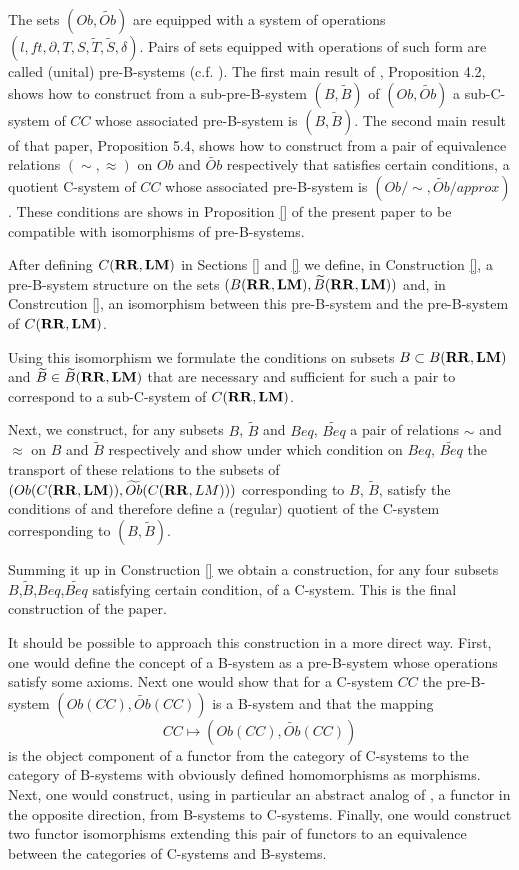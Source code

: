 \documentclass[12pt]{amsart}
\newcommand{\wt}{\widetilde}
\newcommand{\RR}{{\bf RR}}
\newcommand{\LM}{{\bf LM}}
\begin{document}
The sets $(Ob,\wt{Ob})$ are equipped with a system of operations $(l,ft,\partial,T,S,\wt{T},\wt{S},\delta)$. Pairs of sets equipped with operations of such form are called (unital) pre-B-systems (c.f. \cite{Bsystemsnew}). The first main result of \cite{Csubsystems}, Proposition 4.2, shows how to construct from a sub-pre-B-system $(B,\wt{B})$ of $(Ob,\wt{Ob})$ a sub-C-system of $CC$ whose associated pre-B-system is $(B,\wt{B})$. The second main result of that paper, Proposition 5.4, shows how to construct from a pair of equivalence relations $(\sim,\approx)$ on $Ob$ and $\wt{Ob}$ respectively that satisfies certain conditions, a quotient C-system of $CC$ whose associated pre-B-system is $(Ob/\sim,\wt{Ob}/approx)$. These conditions are shows in Proposition \ref{} of the present paper to be compatible with isomorphisms of pre-B-systems. 

After defining $C(\RR,\LM)$ in Sections \ref{} and \ref{} 
we define, in Construction \ref{}, a pre-B-system structure on the sets $(B(\RR,\LM),\wt{B}(\RR,\LM))$ and, in Constrcution \ref{}, an isomorphism between this pre-B-system and the pre-B-system of $C(\RR,\LM)$. 

Using this isomorphism we formulate the conditions on subsets $B\subset B(\RR,\LM)$ and $\wt{B}\in \wt{B}(\RR,\LM)$ that are necessary and sufficient for such a pair to correspond to a sub-C-system of $C(\RR,\LM)$.

Next, we construct, for any subsets $B$, $\wt{B}$ and $Beq$, $\wt{Beq}$ a pair of relations $\sim$ and $\approx$ on $B$ and $\wt{B}$ respectively and show under which condition on $Beq$, $\wt{Beq}$ the transport of these relations to the subsets of $(Ob(C(\RR,\LM)),\wt{Ob}(C(\RR,LM)))$ corresponding to $B$, $\wt{B}$, satisfy the conditions of \cite[Prop. 5.4]{Csubsystems} and therefore define a (regular) quotient of the C-system corresponding to $(B,\wt{B})$.

Summing it up in Construction \ref{} we obtain a construction, for any four subsets $B$,$\wt{B}$,$Beq$,$\wt{Beq}$ satisfying certain condition, of a C-system. This is the final construction of the paper.

It should be possible to approach this construction in a more direct way. First, one would define the concept of a B-system as a pre-B-system whose operations satisfy some axioms. Next one would show that for a C-system $CC$ the pre-B-system $(Ob(CC),\wt{Ob}(CC))$ is a B-system and that the mapping 
%
$$CC\mapsto (Ob(CC),\wt{Ob}(CC))$$
%
is the object component of a functor from the category of C-systems to the category of B-systems with obviously defined homomorphisms as morphisms. Next, one would construct, using in particular an abstract analog of \cite[Def. 2.11]{Hofmann}, a functor in the opposite direction, from B-systems to C-systems. Finally, one would construct two functor isomorphisms extending this pair of functors to an equivalence between the categories of C-systems and B-systems. 
\end{document}
